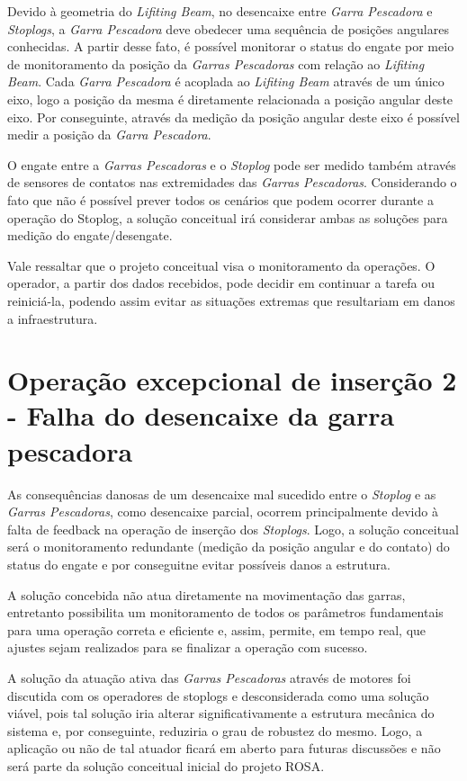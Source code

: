 Devido à geometria do \emph{Lifiting Beam}, no
desencaixe entre \emph{Garra Pescadora} e \emph{Stoplogs}, a \emph{Garra
Pescadora} deve obedecer uma sequência de posições angulares conhecidas. A
partir desse fato, é possível monitorar o status do engate por meio de monitoramento da posição da \emph{Garras Pescadoras} com relação ao \emph{Lifiting Beam}.
Cada \emph{Garra Pescadora} é acoplada ao \emph{Lifiting Beam} através de um único eixo, logo a posição da mesma é diretamente relacionada a posição angular deste eixo. Por conseguinte, através da medição da posição angular deste eixo é possível medir a posição da \emph{Garra Pescadora}. 

O engate entre a \emph{Garras Pescadoras} e o \emph{Stoplog} pode ser medido
também através de sensores de contatos nas extremidades das \emph{Garras Pescadoras}.
Considerando o fato que não é possível prever todos os cenários que podem
ocorrer durante a operação do Stoplog, a solução conceitual irá considerar ambas
as soluções para medição do engate/desengate.

Vale ressaltar que o projeto conceitual visa o monitoramento da operações. O
operador, a partir dos dados recebidos, pode decidir em continuar a tarefa ou
reiniciá-la, podendo assim evitar as situações extremas que resultariam em danos a infraestrutura. 


\section{Operação excepcional de inserção 2 - Falha do desencaixe da garra pescadora}
\label{op:sol:ins:1}

As consequências danosas de um desencaixe mal sucedido entre o \emph{Stoplog} e
as \emph{Garras Pescadoras}, como desencaixe parcial, ocorrem
principalmente devido à falta de feedback na operação de inserção dos \emph{Stoplogs}.
Logo, a solução conceitual será o monitoramento redundante (medição da posição angular e do contato) do status do engate e por conseguitne evitar possíveis danos a estrutura. 

A solução concebida não atua diretamente na movimentação das garras, entretanto
possibilita um monitoramento de todos os parâmetros fundamentais para uma operação correta e eficiente e, assim, permite, em tempo real, que ajustes sejam realizados para se finalizar a
operação com sucesso. 

A solução da atuação ativa das \emph{Garras Pescadoras} através de motores foi
discutida com os operadores de stoplogs e desconsiderada como uma solução
viável, pois tal solução iria alterar significativamente a estrutura mecânica do sistema e, por conseguinte, reduziria o grau de robustez do mesmo. Logo, a aplicação ou não de tal atuador ficará em aberto para futuras discussões e não será parte da solução conceitual inicial do projeto ROSA.

